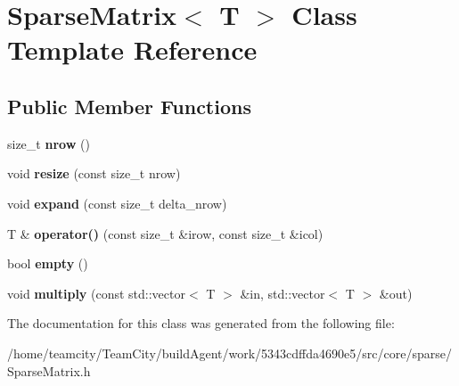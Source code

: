 \hypertarget{classSparseMatrix}{}\section{Sparse\+Matrix$<$ T $>$ Class Template Reference}
\label{classSparseMatrix}
\subsection*{Public Member Functions}
\begin{DoxyCompactItemize}
\item 
size\+\_\+t {\bfseries nrow} ()\hypertarget{classSparseMatrix_a26e7251ae23138fad1bd1cbae4a8bbcb}{}\label{classSparseMatrix_a26e7251ae23138fad1bd1cbae4a8bbcb}

\item 
void {\bfseries resize} (const size\+\_\+t nrow)\hypertarget{classSparseMatrix_a46daf57ff89758a06dea93f03cad646d}{}\label{classSparseMatrix_a46daf57ff89758a06dea93f03cad646d}

\item 
void {\bfseries expand} (const size\+\_\+t delta\+\_\+nrow)\hypertarget{classSparseMatrix_a61e6ac19039ad1ff013892fed6e12c68}{}\label{classSparseMatrix_a61e6ac19039ad1ff013892fed6e12c68}

\item 
T \& {\bfseries operator()} (const size\+\_\+t \&irow, const size\+\_\+t \&icol)\hypertarget{classSparseMatrix_aacc01c3afcbfe013e8792f429cc2d9da}{}\label{classSparseMatrix_aacc01c3afcbfe013e8792f429cc2d9da}

\item 
bool {\bfseries empty} ()\hypertarget{classSparseMatrix_aeadfc818fefa1048b713b2265443269f}{}\label{classSparseMatrix_aeadfc818fefa1048b713b2265443269f}

\item 
void {\bfseries multiply} (const std\+::vector$<$ T $>$ \&in, std\+::vector$<$ T $>$ \&out)\hypertarget{classSparseMatrix_a8139afdc1aa5f5c016c383fd7c68681e}{}\label{classSparseMatrix_a8139afdc1aa5f5c016c383fd7c68681e}

\end{DoxyCompactItemize}


The documentation for this class was generated from the following file\+:\begin{DoxyCompactItemize}
\item 
/home/teamcity/\+Team\+City/build\+Agent/work/5343cdffda4690e5/src/core/sparse/Sparse\+Matrix.\+h\end{DoxyCompactItemize}
